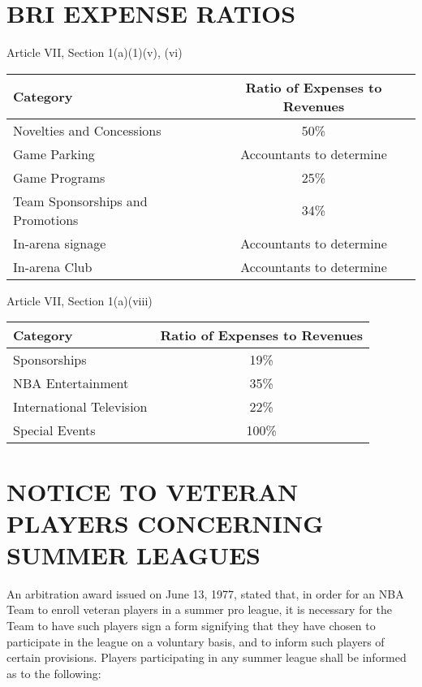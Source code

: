 \documentclass[
]{book}
\begin{document}
\hypertarget{bri-expense-ratios}{%
\chapter{BRI EXPENSE RATIOS}\label{bri-expense-ratios}}

Article VII, Section 1(a)(1)(v), (vi)

\begin{longtable}[]{@{}lc@{}}
\toprule()
Category & Ratio of Expenses to Revenues \\
\midrule()
\endhead
Novelties and Concessions & 50\% \\
Game Parking & Accountants to determine \\
Game Programs & 25\% \\
Team Sponsorships and Promotions & 34\% \\
In-arena signage & Accountants to determine \\
In-arena Club & Accountants to determine \\
\bottomrule()
\end{longtable}

Article VII, Section 1(a)(viii)

\begin{longtable}[]{@{}lc@{}}
\toprule()
Category & Ratio of Expenses to Revenues \\
\midrule()
\endhead
Sponsorships & 19\% \\
NBA Entertainment & 35\% \\
International Television & 22\% \\
Special Events & 100\% \\
\bottomrule()
\end{longtable}

\hypertarget{notice-to-veteran-players-concerning-summer-leagues}{%
\chapter{NOTICE TO VETERAN PLAYERS CONCERNING SUMMER LEAGUES}\label{notice-to-veteran-players-concerning-summer-leagues}}

An arbitration award issued on June 13, 1977, stated that, in order for an NBA Team to enroll veteran players in a summer pro league, it is necessary for the Team to have such players sign a form signifying that they have chosen to participate in the league on a voluntary basis, and to inform such players of certain provisions. Players participating in any summer league shall be informed as to the following:
\end{document}
